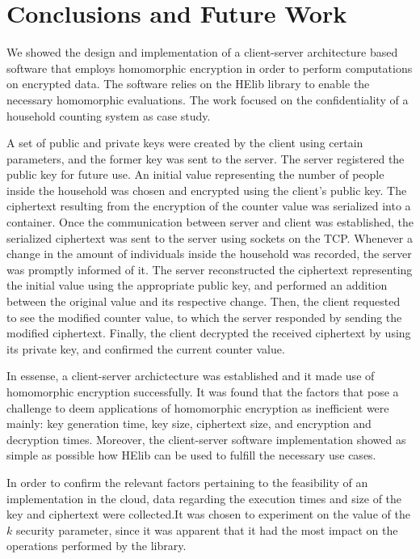 \chapter{Conclusions and Future Work}
\label{conclusions}

We showed the design and implementation of a client-server architecture based software that employs homomorphic encryption in order to perform computations on encrypted data. The software relies on the HElib library to enable the necessary homomorphic evaluations. The work focused on the confidentiality of a household counting system as case study. 

A set of public and private keys were created by the client using certain parameters, and the former key was sent to the server. The server registered the public key for future use. An initial value representing the number of people inside the household was chosen and encrypted using the client's public key. The ciphertext resulting from the encryption of the counter value was serialized into a container. Once the communication between server and client was established, the serialized ciphertext was sent to the server using sockets on the TCP. Whenever a change in the amount of individuals inside the household was recorded, the server was promptly informed of it. The server reconstructed the ciphertext representing the initial value using the appropriate public key, and performed an addition between the original value and its respective change. Then, the client requested to see the modified counter value, to which the server responded by sending the modified ciphertext. Finally, the client decrypted the received ciphertext by using its private key, and confirmed the current counter value. 

In essense, a client-server archictecture was established and it made use of homomorphic encryption successfully. It was found that the factors that pose a challenge to deem applications of homomorphic encryption as inefficient were mainly: key generation time, key size, ciphertext size, and encryption and decryption times. Moreover, the client-server software implementation showed as simple as possible how HElib can be used to fulfill the necessary use cases. 

In order to confirm the relevant factors pertaining to the feasibility of an implementation in the cloud, data regarding the execution times and size of the key and ciphertext were collected.It was chosen to experiment on the value of the $k$ security parameter, since it was apparent that it had the most impact on the operations performed by the library. 

